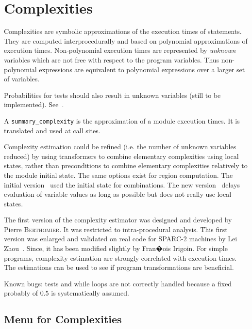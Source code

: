 \documentclass[a4paper]{report}
\newenvironment{PipsPass}[1]{\label{pass:#1}}{}
\begin{document}

\section{Complexities}
\label{subsection-complexities}

\begin{PipsPass}{complexities}
Complexities are symbolic approximations of the execution times of
statements. They are computed interprocedurally and based on polynomial
approximations of execution times. Non-polynomial execution times are
represented by {\em unknown} variables which are not free with respect
to the program variables. Thus non-polynomial expressions are equivalent
to polynomial expressions over a larger set of variables.

Probabilities for tests should also result in
unknown variables (still to be implemented). See~\cite{Zho94}.

A \verb+summary_complexity+ is the approximation of a module execution
times. It is translated and used at call sites.

Complexity estimation could be refined (i.e. the number of unknown
variables reduced) by using transformers to combine elementary
complexities using local states, rather than preconditions to combine
elementary complexities relatively to the module initial state. The same
options exist for region computation. The initial version~\cite{Pla90}
used the initial state for combinations. The new version~\cite{CI95}
delays evaluation of variable values as long as possible but does not
really use local states.

The first version of the complexity estimator was designed and
developed by Pierre \textsc{Berthomier}. It was restricted to intra-procedural
analysis. This first version was enlarged and validated on real code for
SPARC-2 machines by Lei Z{\sc hou}~\cite{Zho94}. Since, it has been modified
slightly by Fran�ois I{\sc rigoin}. For simple programs, complexity
estimation are strongly correlated with execution times. The estimations
can be used to see if program transformations are beneficial.

Known bugs: tests and while loops are not correctly handled because a
fixed probably of 0.5 is systematically assumed.
\end{PipsPass}

\subsection{Menu for Complexities}
\end{document}
